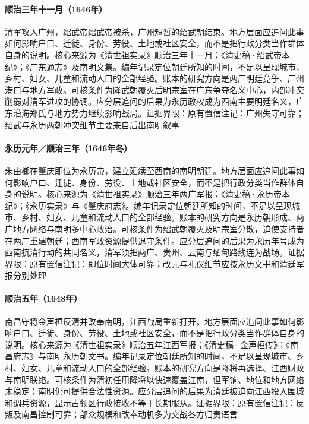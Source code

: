 \hypertarget{social:EQ-1646-SHAOWU-GUANGZHOU}{}\paragraph{顺治三年十一月（1646年）}清军攻入广州，绍武帝绍武帝被杀，广州短暂的绍武朝结束。地方层面应追问此事如何影响户口、迁徙、身份、劳役、土地或社区安全，而不是把行政分类当作群体自身的说明。核心来源为《清世祖实录》顺治三年十一月；《清史稿·绍武帝本纪》；《广东通志》及南明文集。编年记录定位朝廷所知的时间，不足以呈现城市、乡村、妇女、儿童和流动人口的全部经验。账本的研究方向是两广明廷竞争、广州港口与地方军政。可核条件为隆武朝覆灭后明宗室在广东争夺名义中心，内部冲突削弱对清军进攻的协调。应分层追问的后果为永历政权成为西南主要明廷名义，广东沿海郑氏与地方势力继续影响战局。证据界限：原有置信注记：广州失守可靠；绍武与永历两朝冲突细节主要来自后出南明叙事
\hypertarget{social:EQ-1646-YONGLI-ZHAOQING}{}\paragraph{永历元年／顺治三年（1646年冬）}朱由榔在肇庆即位为永历帝，建立延续至西南的南明朝廷。地方层面应追问此事如何影响户口、迁徙、身份、劳役、土地或社区安全，而不是把行政分类当作群体自身的说明。核心来源为《清世祖实录》顺治三年两广军报；《清史稿·永历帝本纪》；《永历实录》与《肇庆府志》。编年记录定位朝廷所知的时间，不足以呈现城市、乡村、妇女、儿童和流动人口的全部经验。账本的研究方向是永历朝形成、两广地方网络与南明多中心政治。可核条件为绍武朝覆灭及明宗室分散，迫使支持者在两广重建朝廷；西南军政资源提供退守条件。应分层追问的后果为永历年号成为西南抗清行动的共同名义，清军须把两广、贵州、云南与缅甸路线连为战场。证据界限：原有置信注记：即位时间大体可靠；改元与礼仪细节应按永历文书和清廷军报分别处理
\hypertarget{social:EQ-1648-JIN-SHENGHUAN}{}\paragraph{顺治五年（1648年）}南昌守将金声桓反清并改奉南明，江西战局重新打开。地方层面应追问此事如何影响户口、迁徙、身份、劳役、土地或社区安全，而不是把行政分类当作群体自身的说明。核心来源为《清世祖实录》顺治五年江西军报；《清史稿·金声桓传》；《南昌府志》与南明永历朝文书。编年记录定位朝廷所知的时间，不足以呈现城市、乡村、妇女、儿童和流动人口的全部经验。账本的研究方向是降将再选择、江西财政与南明联络。可核条件为清初任用降将以快速覆盖江南，但军饷、地位和地方网络未稳定；南明仍可提供合法性资源。应分层追问的后果为清廷被迫向江西投入围城和调兵资源，显示占领区行政接收不等于长期服从。证据界限：原有置信注记：反叛及南昌控制可靠；部众规模和改奉动机多为交战各方归责语言
